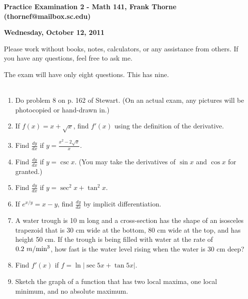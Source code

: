 \documentclass[11pt]{article}
\begin{document}
\setlength{\topmargin}{-2mm}





\begin{center}{\bf Practice Examination 2 - Math 141, Frank Thorne (thornef@mailbox.sc.edu)}
\end{center}
\begin{center}
{\bf Wednesday, October 12, 2011}
\end{center}

Please work without books, notes, calculators, or any assistance from others. If you have
any questions, feel free to ask me. 

The exam will have only eight questions. This has nine.
\\
\\
\begin{enumerate}[(1)]
\item
Do problem 8 on p. 162 of Stewart. (On an actual exam, any pictures will be photocopied
or hand-drawn in.)

\item
If $f(x) = x + \sqrt{x}$, find $f'(x)$ using the definition of the derivative.

\item
Find $\frac{dy}{dx}$ if $y = \frac{x^2 - 2 \sqrt{x}}{x}$.

\item
Find $\frac{dy}{dx}$ if $y = \csc x$. (You may take the derivatives of $\sin x$ and $\cos x$
for granted.)

\item
Find $\frac{dy}{dx}$ if $y = \sec^2 x + \tan^2 x$.

\item
If $e^{x/y} = x - y$, find $\frac{dy}{dx}$ by implicit differentiation.

\item
A water trough is 10 m long and a cross-section has the shape of an
isosceles trapezoid that is 30 cm wide at the bottom, 80 cm wide at the top,
and has height 50 cm. If the trough is being filled with water at the rate of
$0.2 \ m/\textnormal{min}^3$, how fast is the water level rising when the water
is 30 cm deep?

\item
Find $f'(x)$ if $f = \ln | \sec 5x + \tan 5x |$.

\item
Sketch the graph of a function that has two local maxima, one
local minimum, and no absolute maximum.


\end{enumerate}
\end{document}
